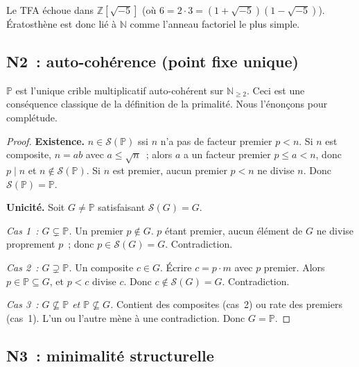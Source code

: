 \documentclass[12pt,a4paper]{article}
\begin{document}
\begin{remarque}
Le TFA échoue dans $\mathbb{Z}[\sqrt{-5}]$ (où
$6 = 2 \cdot 3 = (1+\sqrt{-5})(1-\sqrt{-5})$). Ératosthène est donc
lié à $\mathbb{N}$ comme l'anneau factoriel le plus simple.
\end{remarque}

\subsection{N2~: auto-cohérence (point fixe unique)}
\label{sec:N2}

\mTHM
\begin{theoreme}
\label{thm:N2}
$\mathbb{P}$ est l'unique crible multiplicatif auto-cohérent sur
$\mathbb{N}_{\geq 2}$. Ceci est une conséquence classique de la
définition de la primalité. Nous l'énonçons pour complétude.

\begin{proof}
\textbf{Existence.} $n \in \mathcal{S}(\mathbb{P})$ ssi $n$ n'a pas
de facteur premier $p < n$. Si $n$ est composite, $n = ab$ avec
$a \leq \sqrt{n}$~; alors $a$ a un facteur premier $p \leq a < n$,
donc $p \mid n$ et $n \notin \mathcal{S}(\mathbb{P})$. Si $n$ est
premier, aucun premier $p < n$ ne divise $n$. Donc
$\mathcal{S}(\mathbb{P}) = \mathbb{P}$.

\textbf{Unicité.} Soit $G \neq \mathbb{P}$ satisfaisant
$\mathcal{S}(G) = G$.

\textit{Cas 1~: $G \subsetneq \mathbb{P}$.} Un premier $p \notin G$.
$p$ étant premier, aucun élément de $G$ ne divise proprement $p$~;
donc $p \in \mathcal{S}(G) = G$. Contradiction.

\textit{Cas 2~: $G \supsetneq \mathbb{P}$.} Un composite $c \in G$.
Écrire $c = p \cdot m$ avec $p$ premier. Alors
$p \in \mathbb{P} \subseteq G$, et $p < c$ divise $c$. Donc
$c \notin \mathcal{S}(G) = G$. Contradiction.

\textit{Cas 3~: $G \not\subseteq \mathbb{P}$ et $\mathbb{P} \not\subseteq G$.}
Contient des composites (cas~2) ou rate des premiers (cas~1). L'un
ou l'autre mène à une contradiction. Donc $G = \mathbb{P}$.
\end{proof}
\end{theoreme}

\subsection{N3~: minimalité structurelle}
\label{sec:N3}
\end{document}
